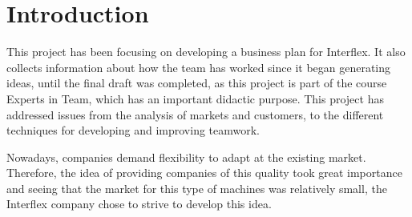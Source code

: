 \section{Introduction}

This project has been focusing on developing a business plan for Interflex. It also collects information about how the team has worked since it began generating ideas, until the final draft was completed, as this project is part of the course Experts in Team, which has an important didactic purpose. This project has addressed issues from the analysis of markets and customers, to the different techniques for developing and improving teamwork.

Nowadays, companies demand flexibility to adapt at the existing market. Therefore, the idea of providing companies of this quality took great importance and seeing that the market for this type of machines was relatively small, the Interflex  company chose to strive to develop this idea.


